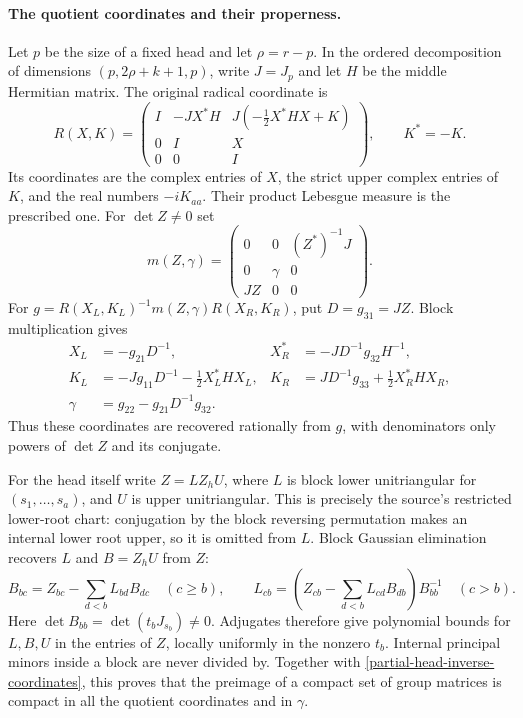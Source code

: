 \paragraph{The quotient coordinates and their properness.}
Let $p$ be the size of a fixed head and let $\rho=r-p$.
In the ordered decomposition of dimensions $(p,2\rho+k+1,p)$,
write $J=J_p$ and let $H$ be the middle Hermitian matrix.  The
original radical coordinate is
\[
 R(X,K)=
 \begin{pmatrix}
 I&-JX^*H&J(-\tfrac12X^*HX+K)\\
 0&I&X\\0&0&I
 \end{pmatrix},\qquad K^*=-K.
\]
Its coordinates are the complex entries of $X$, the strict upper
complex entries of $K$, and the real numbers $-iK_{aa}$.
Their product Lebesgue measure is the prescribed one.
For $\det Z\ne0$ set
\[
 m(Z,\gamma)=
 \begin{pmatrix}0&0&(Z^*)^{-1}J\\0&\gamma&0\\JZ&0&0\end{pmatrix}.
\]
For $g=R(X_L,K_L)^{-1}m(Z,\gamma)R(X_R,K_R)$, put
$D=g_{31}=JZ$.  Block multiplication gives
\begin{equation}\label{partial-head-inverse-coordinates}
 \begin{aligned}
 X_L&=-g_{21}D^{-1},&
 X_R^*&=-JD^{-1}g_{32}H^{-1},\\
 K_L&=-Jg_{11}D^{-1}-\tfrac12X_L^*HX_L,&
 K_R&=JD^{-1}g_{33}+\tfrac12X_R^*HX_R,\\
 \gamma&=g_{22}-g_{21}D^{-1}g_{32}.&&
 \end{aligned}
\end{equation}
Thus these coordinates are recovered rationally from $g$, with
denominators only powers of $\det Z$ and its conjugate.

For the head itself write $Z=LZ_hU$, where $L$ is block lower
unitriangular for $(s_1,\ldots,s_a)$, and $U$ is upper
unitriangular.  This is precisely the source's restricted
lower-root chart: conjugation by the block reversing permutation
makes an internal lower root upper, so it is omitted from $L$.
Block Gaussian elimination recovers $L$ and $B=Z_hU$ from $Z$:
\[
 B_{bc}=Z_{bc}-\sum_{d<b}L_{bd}B_{dc}\quad(c\ge b),\qquad
 L_{cb}=\left(Z_{cb}-\sum_{d<b}L_{cd}B_{db}\right)B_{bb}^{-1}
       \quad(c>b).
\]
Here $\det B_{bb}=\det(t_bJ_{s_b})\ne0$.  Adjugates therefore
give polynomial bounds for $L,B,U$ in the entries of $Z$, locally
uniformly in the nonzero $t_b$.  Internal principal minors inside
a block are never divided by.  Together with
\eqref{partial-head-inverse-coordinates}, this proves that the
preimage of a compact set of group matrices is compact in all
the quotient coordinates and in $\gamma$.

